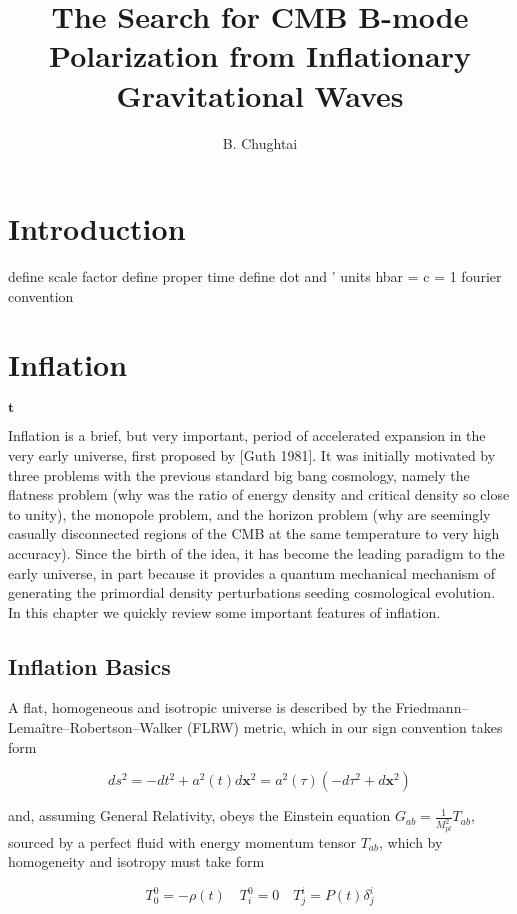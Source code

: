 \documentclass[a4paper,11pt]{article}
\title{\boldmath The Search for CMB B-mode Polarization from Inflationary Gravitational Waves}
\author{B. Chughtai}
\affiliation{University of Cambridge, Cambridge, UK}
\renewcommand{\v}[1]{\mathbf{#1}}
\newcommand{\Mp}{M_{pl}}
\begin{document}
\maketitle
\flushbottom


\section{Introduction}

define scale factor
define proper time
define dot and '
units hbar = c = 1
fourier convention

\section{Inflation}

$\v{t}$

Inflation is a brief, but very important, period of accelerated expansion in the very early universe, first proposed by [Guth 1981]. It was initially motivated by three problems with the previous standard big bang cosmology, namely the flatness problem (why was the ratio of energy density and critical density so close to unity), the monopole problem, and the horizon problem (why are seemingly casually disconnected regions of the CMB at the same temperature to very high accuracy). Since the birth of the idea, it has become the leading paradigm to the early universe, in part because it provides a quantum mechanical mechanism of generating the primordial density perturbations seeding cosmological evolution. In this chapter we quickly review some important features of inflation.

\subsection{Inflation Basics}

A flat, homogeneous and isotropic universe is described by the Friedmann–Lemaître–Robertson–Walker (FLRW) metric, which in our sign convention takes form

\begin{equation}
\label{FLRW}
ds^2 = - dt^2 + a^2(t)d\v{x}^2 = a^2(\tau)(-d\tau^2+d\v{x}^2)
\end{equation}

and, assuming General Relativity, obeys the Einstein equation $G_{ab} = \frac{1}{\Mp^2} T_{ab}$, sourced by a perfect fluid with energy momentum tensor $T_{ab}$, which by homogeneity and isotropy must take form

\begin{equation}
\label{densityandpressure}
T^0_0 = - \rho(t) \quad T^0_i = 0 \quad T^i_j = P(t)\delta^i_j
\end{equation}
\end{document}

